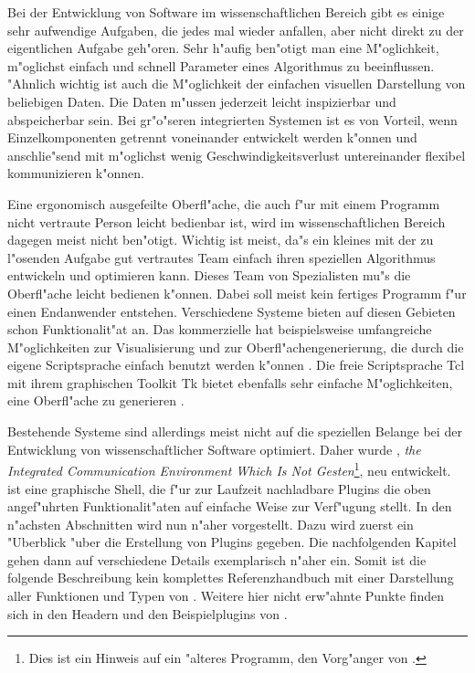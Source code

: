 \label{chap:p_icewing}

Bei der Entwicklung von Software im wissenschaftlichen Bereich gibt
es einige sehr aufwendige Aufgaben, die jedes mal wieder anfallen,
aber nicht direkt zu der eigentlichen Aufgabe geh"oren. Sehr h"aufig
ben"otigt man eine M"oglichkeit, m"oglichst einfach und schnell
Parameter eines Algorithmus zu beeinflussen. "Ahnlich wichtig ist
auch die M"oglichkeit der einfachen visuellen Darstellung von
beliebigen Daten. Die Daten m"ussen jederzeit
leicht inspizierbar und abspeicherbar sein. Bei gr"o"seren
integrierten Systemen ist es von Vorteil, wenn Einzelkomponenten
getrennt voneinander entwickelt werden k"onnen und anschlie"send mit
m"oglichst wenig Geschwindigkeitsverlust untereinander flexibel
kommunizieren k"onnen.

Eine ergonomisch ausgefeilte Oberfl"ache, die auch f"ur mit einem
Programm nicht vertraute Person leicht bedienbar ist, wird im
wissenschaftlichen Bereich dagegen meist nicht ben"otigt. Wichtig
ist meist, da"s ein kleines mit der zu l"osenden Aufgabe gut
vertrautes Team einfach ihren speziellen Algorithmus entwickeln und
optimieren kann. Dieses Team von Spezialisten mu"s die Oberfl"ache
leicht bedienen k"onnen. Dabei soll meist kein fertiges Programm
f"ur einen Endanwender entstehen. Verschiedene Systeme bieten auf
diesen Gebieten schon Funktionalit"at an. Das kommerzielle
\matlab{} hat beispielsweise umfangreiche
M"oglichkeiten zur Visualisierung und zur Oberfl"achengenerierung,
die durch die \matlab{} eigene Scriptsprache einfach benutzt werden
k"onnen \cite{Matlab2003}. Die freie Scriptsprache Tcl mit ihrem
graphischen Toolkit Tk bietet ebenfalls sehr einfache
M"oglichkeiten, eine Oberfl"ache zu generieren
\cite{Ousterhout1994-TAT}.

Bestehende Systeme sind allerdings meist nicht auf die speziellen
Belange bei der Entwicklung von wissenschaftlicher Software
optimiert. Daher wurde \icewing{}, \emph{the Integrated
Communication Environment Which Is Not Gesten}\footnote{Dies ist
ein Hinweis auf ein "alteres Programm, den Vorg"anger von
\icewing{}.}, neu entwickelt. \icewing{} ist eine graphische Shell,
die f"ur zur Laufzeit nachladbare Plugins die oben
angef"uhrten Funktionalit"aten auf einfache Weise zur Verf"ugung
stellt. In den n"achsten Abschnitten wird \icewing{} nun n"aher
vorgestellt. Dazu wird zuerst ein "Uberblick "uber die Erstellung
von Plugins gegeben. Die nachfolgenden Kapitel gehen dann auf
verschiedene Details exemplarisch n"aher ein. Somit ist die folgende
Beschreibung kein komplettes Referenzhandbuch mit einer Darstellung
aller Funktionen und Typen von \icewing{}. Weitere hier nicht
erw"ahnte Punkte finden sich in den Headern und den Beispielplugins
von \icewing{}.

